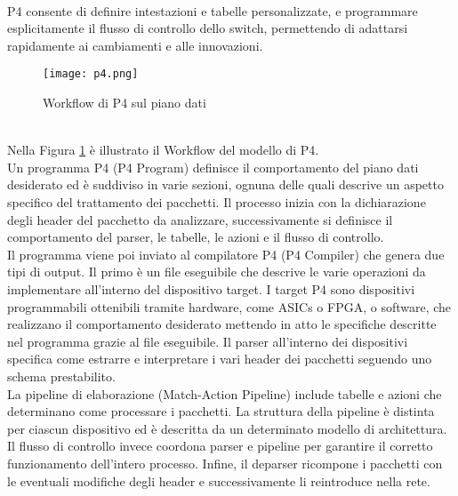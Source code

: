 \\P4 consente di definire intestazioni e tabelle personalizzate, e programmare esplicitamente il flusso di controllo dello switch, permettendo di adattarsi rapidamente ai cambiamenti e alle innovazioni.
\begin{figure}[h]
    \centering
   \texttt{[image: p4.png]}
    \caption{Workflow di P4 sul piano dati \cite{p4Article}}
    \label{fig:p4}
\end{figure}
\\Nella Figura \ref{fig:p4} è illustrato il Workflow del modello di P4.
\\Un programma P4 (P4 Program) definisce il comportamento del piano dati desiderato ed è suddiviso in varie sezioni, ognuna delle quali descrive un aspetto specifico del trattamento dei pacchetti.
Il processo inizia con la dichiarazione degli header del pacchetto da analizzare, successivamente si
definisce il comportamento del parser, le tabelle, le azioni e il flusso di controllo.
\\Il programma viene poi inviato al compilatore P4 (P4 Compiler) che genera due tipi di output. 
Il primo è un file eseguibile che descrive le varie operazioni da implementare all'interno del dispositivo target.
I target P4 sono dispositivi programmabili ottenibili tramite hardware, come ASICs o FPGA, o software, che realizzano il comportamento desiderato mettendo in atto le specifiche descritte nel programma grazie al file eseguibile.
Il parser all'interno dei dispositivi specifica come estrarre e interpretare i vari header dei pacchetti seguendo uno schema prestabilito.
\\La pipeline di elaborazione (Match-Action Pipeline) include tabelle e azioni che determinano come processare i pacchetti. %
La struttura della pipeline è distinta per ciascun dispositivo ed è descritta da un determinato modello di architettura.
Il flusso di controllo invece coordona parser e pipeline per garantire il corretto funzionamento dell'intero processo.
Infine, il deparser ricompone i pacchetti con le eventuali modifiche degli header e successivamente li reintroduce nella rete.
